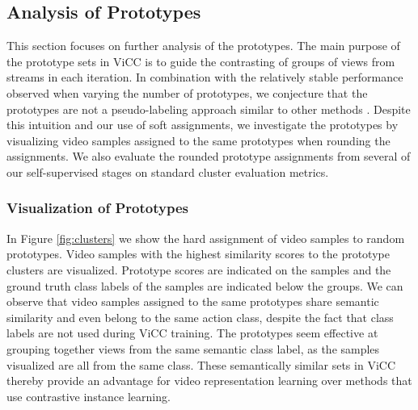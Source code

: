 \documentclass[10pt,twocolumn,letterpaper]{article}
\begin{document}
\subsection{Analysis of Prototypes}

This section focuses on further analysis of the prototypes. The main purpose of the prototype sets in ViCC is to guide the contrasting of groups of views from streams in each iteration. In combination with the relatively stable performance observed when varying the number of prototypes, we conjecture that the prototypes are not a pseudo-labeling approach similar to other methods \cite{asano_self-labelling_2020, asano_labelling_2020, gavrilyuk_motion-augmented_2021, caron_deep_2018, yan_clusterfit_2020}. Despite this intuition and our use of soft assignments, we investigate the prototypes by visualizing video samples assigned to the same prototypes when rounding the assignments. We also evaluate the rounded prototype assignments from several of our self-supervised stages on standard cluster evaluation metrics. 

\subsubsection{Visualization of Prototypes} In Figure \ref{fig:clusters} we show the hard assignment of video samples to random prototypes. Video samples with the highest similarity scores to the prototype clusters are visualized. Prototype scores are indicated on the samples and the ground truth class labels of the samples are indicated below the groups. We can observe that video samples assigned to the same prototypes share semantic similarity and even belong to the same action class, despite the fact that class labels are not used during ViCC training. The prototypes seem effective at grouping together views from the same semantic class label, as the samples visualized are all from the same class. These semantically similar sets in ViCC thereby provide an advantage for video representation learning over methods that use contrastive instance learning.
\end{document}
